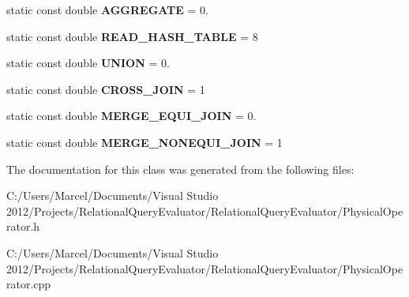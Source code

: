 \begin{DoxyCompactItemize}
\item 
\hypertarget{class_time_complexity_a9bb16133f1284faf24bd901d8947b896}{static const double {\bfseries A\+G\+G\+R\+E\+G\+A\+T\+E} = 0.}\label{class_time_complexity_a9bb16133f1284faf24bd901d8947b896}

\item 
\hypertarget{class_time_complexity_a7b47ef70ce9096d049a233c819c850de}{static const double {\bfseries R\+E\+A\+D\+\_\+\+H\+A\+S\+H\+\_\+\+T\+A\+B\+L\+E} = 8}\label{class_time_complexity_a7b47ef70ce9096d049a233c819c850de}

\item 
\hypertarget{class_time_complexity_a91493cbef5029bd9aa68e0106c603f6a}{static const double {\bfseries U\+N\+I\+O\+N} = 0.}\label{class_time_complexity_a91493cbef5029bd9aa68e0106c603f6a}

\item 
\hypertarget{class_time_complexity_afe17c2e0735b25c3fe8df95d00affc91}{static const double {\bfseries C\+R\+O\+S\+S\+\_\+\+J\+O\+I\+N} = 1}\label{class_time_complexity_afe17c2e0735b25c3fe8df95d00affc91}

\item 
\hypertarget{class_time_complexity_a6d5c9703d95ebce5c94a159991de53b5}{static const double {\bfseries M\+E\+R\+G\+E\+\_\+\+E\+Q\+U\+I\+\_\+\+J\+O\+I\+N} = 0.}\label{class_time_complexity_a6d5c9703d95ebce5c94a159991de53b5}

\item 
\hypertarget{class_time_complexity_a5c7a2b2c29677f090bae490f57d486fa}{static const double {\bfseries M\+E\+R\+G\+E\+\_\+\+N\+O\+N\+E\+Q\+U\+I\+\_\+\+J\+O\+I\+N} = 1}\label{class_time_complexity_a5c7a2b2c29677f090bae490f57d486fa}

\end{DoxyCompactItemize}


The documentation for this class was generated from the following files\+:\begin{DoxyCompactItemize}
\item 
C\+:/\+Users/\+Marcel/\+Documents/\+Visual Studio 2012/\+Projects/\+Relational\+Query\+Evaluator/\+Relational\+Query\+Evaluator/Physical\+Operator.\+h\item 
C\+:/\+Users/\+Marcel/\+Documents/\+Visual Studio 2012/\+Projects/\+Relational\+Query\+Evaluator/\+Relational\+Query\+Evaluator/Physical\+Operator.\+cpp\end{DoxyCompactItemize}
